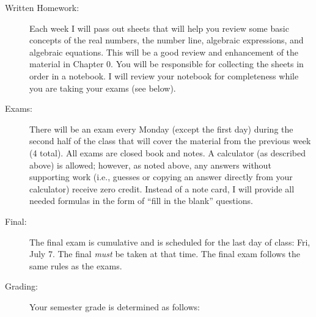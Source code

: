\documentclass[letterpaper,12pt,fleqn]{article}
\begin{document}
\begin{description}
\item[Written Homework:] Each week I will pass out sheets that will help you review some
  basic concepts of the real numbers, the number line, algebraic expressions, and
  algebraic equations. This will be a good review and enhancement of the material in
  Chapter 0. You will be responsible for collecting the sheets in order in a notebook.
  I will review your notebook for completeness while you are taking your exams
  (see below).

\item[Exams:] There will be an exam every Monday (except the first day) during the second
  half of the class that will cover the material from the previous week (4 total). All
  exams are closed book and notes. A calculator (as described above) is allowed; however,
  as noted above, any answers without supporting work (i.e., guesses or copying an answer
  directly from your calculator) receive zero credit. Instead of a note card, I will
  provide all needed formulas in the form of ``fill in the blank'' questions.

\item[Final:] The final exam is cumulative and is scheduled for the last day of class:
  Fri, July 7. The final \emph{must} be taken at that time. The final exam follows the
  same rules as the exams.
\newpage
\item[Grading:]  Your semester grade is determined as follows:

  \bigskip


\end{description}
\end{document}
